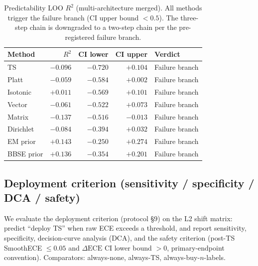 \documentclass[review,12pt,nonatbib]{elsarticle}
\begin{document}
\begin{table}[t]
\centering
\caption{Predictability LOO $R^2$ (multi-architecture merged). All
methods trigger the failure branch (CI upper bound $<0.5$). The
three-step chain is downgraded to a two-step chain per the
pre-registered failure branch.}
\label{tab:predictability}
\begin{tabular}{lrrrl}
\toprule
Method & $R^2$ & CI lower & CI upper & Verdict \\
\midrule
TS         & $-0.096$ & $-0.720$ & $+0.104$ & Failure branch \\
Platt      & $-0.059$ & $-0.584$ & $+0.002$ & Failure branch \\
Isotonic   & $+0.011$ & $-0.569$ & $+0.101$ & Failure branch \\
Vector     & $-0.061$ & $-0.522$ & $+0.073$ & Failure branch \\
Matrix     & $-0.137$ & $-0.516$ & $-0.013$ & Failure branch \\
Dirichlet  & $-0.084$ & $-0.394$ & $+0.032$ & Failure branch \\
EM prior   & $+0.143$ & $-0.250$ & $+0.274$ & Failure branch \\
BBSE prior & $+0.136$ & $-0.354$ & $+0.201$ & Failure branch \\
\bottomrule
\end{tabular}
\end{table}

\subsection{Deployment criterion (sensitivity / specificity / DCA / safety)}
\label{sec:deployment}
We evaluate the deployment criterion (protocol \S9) on the L2 shift
matrix: predict ``deploy TS'' when raw ECE exceeds a threshold, and
report sensitivity, specificity, decision-curve analysis (DCA), and the
safety criterion (post-TS SmoothECE $\leq 0.05$ and $\Delta\text{ECE}$ CI
lower bound $>0$, primary-endpoint convention). Comparators: always-none,
always-TS, always-buy-$n$-labels.
\end{document}

